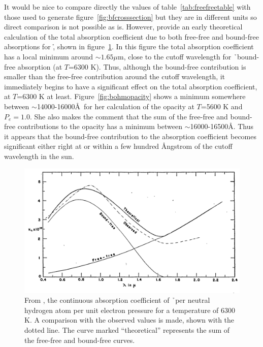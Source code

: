 It would be nice to compare directly the values of table~\ref{tab:freefreetable} with those used to generate figure~\ref{fig:bfcrosssection} but they are in different units so direct comparison is not possible as is.  However, \cite{chandra1946} provide an early theoretical calculation of the total absorption coefficient due to both free-free and bound-free absorptions for \h, shown in figure~\ref{fig:chandratotal}.  In this figure the total absorption coefficient has a local minimum around $\sim1.65\mu$m, close to the cutoff wavelength for \h\ bound-free absorption (at $T$=6300 K).  Thus, although the bound-free contribution is smaller than the free-free contribution around the cutoff wavelength, it immediately begins to have a significant effect on the total absorption coefficient, at $T$=6300 K at least.  Figure~\ref{fig:bohmopacity} shows a minimum somewhere between $\sim$14000-16000\AA\ for her calculation of the opacity at $T$=5600 K and $P_e=1.0$.  She also makes the comment that the sum of the free-free and bound-free contributions to the opacity has a minimum between $\sim$16000-16500\AA. Thus it appears that the bound-free contribution to the absorption coefficient becomes significant either right at or within a few hundred \AA ngstrom of the cutoff wavelength in the sun.
\begin{figure}
\includegraphics[width=\linewidth]{figs/chandraopacity.png}
\caption{\label{fig:chandratotal}From \cite{chandra1946}, the continuous absorption coefficient of \h\ per neutral hydrogen atom per unit electron pressure for a temperature of 6300 K.  A comparison with the observed values is made, shown with the dotted line.  The curve marked ``theoretical'' represents the sum of the free-free and bound-free curves.}
\end{figure}
